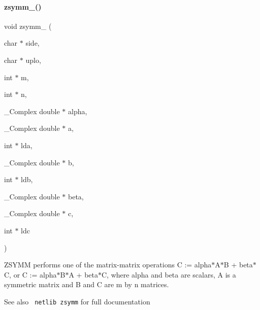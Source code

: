 \paragraph{zsymm\_()}
{\footnotesize\ttfamily void zsymm\+\_\+ (\begin{DoxyParamCaption}\item[{char $\ast$}]{side,  }\item[{char $\ast$}]{uplo,  }\item[{int $\ast$}]{m,  }\item[{int $\ast$}]{n,  }\item[{\+\_\+\+Complex double $\ast$}]{alpha,  }\item[{\+\_\+\+Complex double $\ast$}]{a,  }\item[{int $\ast$}]{lda,  }\item[{\+\_\+\+Complex double $\ast$}]{b,  }\item[{int $\ast$}]{ldb,  }\item[{\+\_\+\+Complex double $\ast$}]{beta,  }\item[{\+\_\+\+Complex double $\ast$}]{c,  }\item[{int $\ast$}]{ldc }\end{DoxyParamCaption})}

Z\+S\+Y\+MM performs one of the matrix-\/matrix operations C \+:= alpha$\ast$\+A$\ast$B + beta$\ast$C, or C \+:= alpha$\ast$\+B$\ast$A + beta$\ast$C, where alpha and beta are scalars, A is a symmetric matrix and B and C are m by n matrices. \begin{DoxySeeAlso}{See also}
{\texttt{ netlib zsymm}} for full documentation 
\end{DoxySeeAlso}
